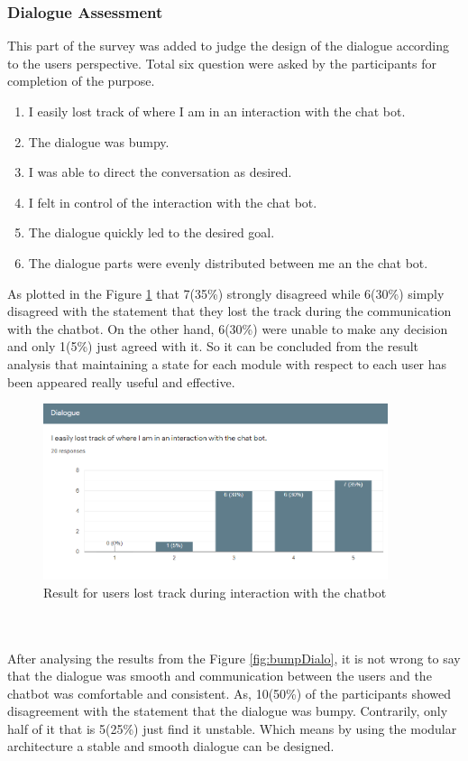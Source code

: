 \subsubsection*{Dialogue Assessment}
This part of the survey was added to judge the design of the dialogue according to the users perspective. Total six question were asked by the participants for completion of the purpose.
\begin{enumerate}
    \item I easily lost track of where I am in an interaction with the chat bot.
    \item The dialogue was bumpy.
    \item I was able to direct the conversation as desired.
    \item I felt in control of the interaction with the chat bot.
    \item The dialogue quickly led to the desired goal.
    \item The dialogue parts were evenly distributed between me an the chat bot.
\end{enumerate}
As plotted in the Figure \ref{fig:lostTrack} that 7(35\%) strongly disagreed while 6(30\%) simply disagreed with the statement that they lost the track during the communication with the chatbot. On the other hand, 6(30\%) were unable to make any decision and only 1(5\%) just agreed with it. So it can be concluded from the result analysis that maintaining a state for each module with respect to each user has been appeared really useful and effective.

\begin{figure}[!h]
    \centering
    \includegraphics[width=0.9\textwidth]{img/Lost_Track.PNG}
    \caption{Result for users lost track during interaction with the chatbot}
    \label{fig:lostTrack}
\end{figure}
\\~\\
After analysing the results from the Figure \ref{fig:bumpDialo}, it is not wrong to say that the dialogue was smooth and communication between the users and the chatbot was comfortable and consistent. As, 10(50\%) of the participants showed disagreement with the statement that the dialogue was bumpy. Contrarily, only half of it that is 5(25\%) just find it unstable. Which means by using the modular architecture a stable and smooth dialogue can be designed.

